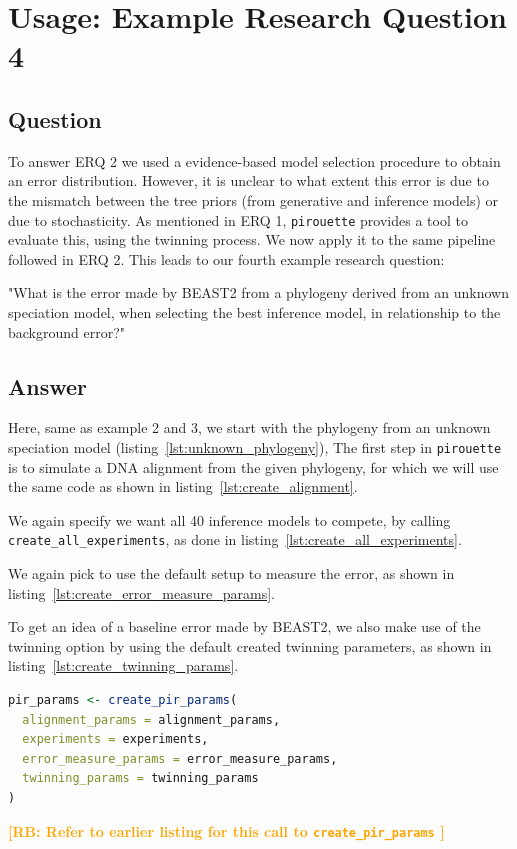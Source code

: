\documentclass{article}
\newcommand{\richel}[1]{\textcolor{orange}{\textbf{[RB: #1]}}}
\begin{document}
\section{Usage: Example Research Question 4}

\subsection{Question}

To answer ERQ 2 we used a evidence-based model selection procedure to obtain an 
error distribution.
However, it is unclear to what extent this error is due to the mismatch between 
the tree priors (from generative and inference models) or due to stochasticity. 
As mentioned in ERQ 1, \verb;pirouette; provides a tool to evaluate this, using 
the twinning process. We now apply it to the same pipeline followed in ERQ 2.
This leads to our fourth example research question:

"What is the error made by BEAST2 from a phylogeny 
derived from an unknown speciation model,
when selecting the best inference model, 
in relationship to the background error?"

\subsection{Answer}

Here, same as example 2 and 3, we start with the phylogeny 
from an unknown speciation model (listing~\ref{lst:unknown_phylogeny}), 
The first step in \verb;pirouette; is to simulate a DNA alignment 
from the given phylogeny, for which we will use the same code 
as shown in listing~\ref{lst:create_alignment}.

We again specify we want all 40 inference models to compete, 
by calling \verb;create_all_experiments;,
as done in listing~\ref{lst:create_all_experiments}.

We again pick to use the default setup to measure the error,
as shown in listing~\ref{lst:create_error_measure_params}.

To get an idea of a baseline error made by BEAST2, 
we also make use of the twinning option by using the
default created twinning parameters, as shown in 
listing~\ref{lst:create_twinning_params}.

\begin{lstlisting}[language=R, floatplacement=ht, frame=single]
pir_params <- create_pir_params(
  alignment_params = alignment_params,
  experiments = experiments,
  error_measure_params = error_measure_params,
  twinning_params = twinning_params
)
\end{lstlisting}
\richel{
  Refer to earlier listing for this call to \texttt{create\_pir\_params}
}
\end{document}
